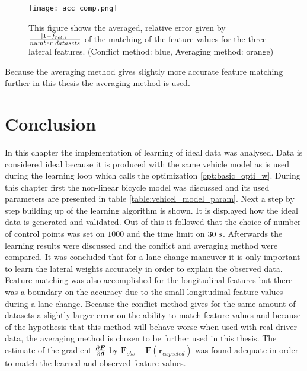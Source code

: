 \begin{figure}[h!]
	\centering
	\texttt{[image: acc\_comp.png]}
	\caption{This figure shows the averaged, relative error given by $\frac{|1-f_{rel,i}|}{number\hspace{1mm}datasets}$ of the matching of the feature values for the three lateral features. (Conflict method: blue, Averaging method: orange)}
	\label{fig:acc_comp}
\end{figure}

Because the averaging method gives slightly more accurate feature matching further in this thesis the averaging method is used.

 
 \section{Conclusion}
In this chapter the implementation of learning of ideal data was analysed. Data is considered ideal because it is produced with the same vehicle model as is used during the learning loop which calls the optimization \ref{opt:basic_opti_w}. During this chapter first the non-linear bicycle model was discussed and its used parameters are presented in table \ref{table:vehicel_model_param}. Next a step by step building up of the learning algorithm is shown. It is displayed how the ideal data is generated and validated. Out of this it followed that the choice of number of control points was set on $1000$ and the time limit on $30 \hspace{1mm}s$. Afterwards the learning results were discussed and the conflict and averaging method were compared. It was concluded that for a lane change maneuver it is only important to learn the lateral weights accurately in order to explain the observed data. Feature matching was also accomplished for the longitudinal features but there was a boundary on the accuracy due to the small longitudinal feature values during a lane change. Because the conflict method gives for the same amount of datasets a slightly larger error on the ability to match feature values and because of the hypothesis that this method will behave worse when used with real driver data, the averaging method is chosen to be further used in this thesis. The estimate of the gradient $\pdv{\bm{F}}{\bm{\theta}}$ by $\bm{F}_{obs} - \bm{F}(\bm{r}_{expected})$ was found adequate in order to match the learned and observed feature values.



